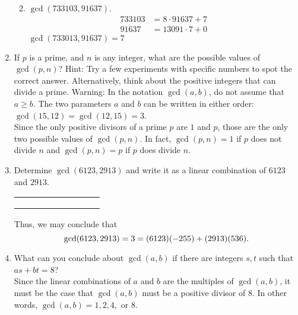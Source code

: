 \documentclass[11pt]{amsart}
\begin{document}
\begin{enumerate}
\begin{enumerate}
{ } 
 
 \item $\gcd(733103,91637)$.
 {\color{blue}
 \begin{align*}
 733103 &= 8\cdot91637 + 7\\
 91637 &= 13091\cdot7+0 
 \end{align*}
$\gcd(733013,91637) = 7$\\[5pt]

 }
 
  \end{enumerate}
 
 
\item  If $p$ is a prime, and $n$ is any integer, what are the
possible values of $\gcd(p,n)$?
Hint: Try a few experiments with specific numbers to spot the correct answer. Alternatively, think about the positive integers that can divide a prime. Warning: In the notation $\gcd(a,b)$, do not assume that $a\geq b$.
The two parameters $a$ and $b$ can be written in either order: $\gcd(15,12) = \gcd(12,15) = 3$.\\[3pt]
{\color{blue}
Since the only positive divisors of a prime $p$ are $1$ and $p$, those are the only two possible values of $\gcd(p,n)$. In fact, $\gcd(p,n) = 1$ if $p$ does not divide $n$ and $\gcd(p,n) = p$ if $p$ does divide $n$.\\[5pt]
}


\item Determine $\gcd(6123,2913)$ and write it as a linear combination of $6123$ and $2913$. 

{\color{blue}

\begin{table}[!h]
\renewcommand{\arraystretch}{1.25}
\begin{tabular}{|*{9}{>{\raggedleft\arraybackslash}p{0.996cm}|}}
 \hline
 6123&2913&297&240&57&12&9&3&0\\
  \hline
  &&2&9&4&4&4&1&3 \\
 \hline
 0&1&-2&19&-21&103&-433&536&-2041 \\
 \hline
 1&0&1&-9&10&-49&206&-255&981 \\
 \hline
\end{tabular}
\end{table}

Thus, we may conclude that 
\[
\gcd(6123,2913) = 3 = (6123)(-255) + (2913)(536).\\[5pt]
\]

}

\item What can you conclude about $\gcd(a,b)$ if there are integers $s,t$ such that $as+bt = 8$?\\[3pt]
{\color{blue}
Since the linear combinations of $a$ and $b$ are the multiples of $\gcd(a,b)$, it must be the case that
$\gcd(a,b)$ must be a positive divisor of $8$. In other words, $\gcd(a,b) = 1, 2, 4,$ or $8$.\\[5pt] 
}


\end{enumerate}
\end{document}
